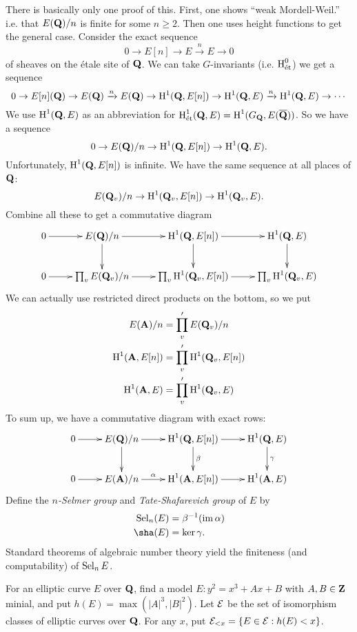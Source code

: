 There is basically only one proof of this. First, one shows ``weak 
Mordell-Weil.'' i.e. that $E(\mathbf{Q})/n$ is finite for some $n\geq 2$. Then one 
uses height functions to get the general case. Consider the exact sequence 
\[
  0 \to E[n] \to E\xrightarrow n E \to 0
\]
of sheaves on the \'etale site of $\mathbf{Q}$. We can take $G$-invariants (i.e. 
$\operatorname{H}_{\textnormal{\'et}}^0$) we get a sequence 
\[
  0 \to E[n](\mathbf{Q}) \to E(\mathbf{Q}) \xrightarrow n E(\mathbf{Q}) \to \operatorname{H}^1(\mathbf{Q}, E[n]) \to \operatorname{H}^1(\mathbf{Q},E) \xrightarrow n \operatorname{H}^1(\mathbf{Q},E) \to \cdots
\]
We use $\operatorname{H}^1(\mathbf{Q},E)$ as an abbreviation for 
$\operatorname{H}_{\textnormal{\'et}}^1(\mathbf{Q},E) = \operatorname{H}^1(G_{\mathbf{Q}},E(\overline{\mathbf{Q}}))$. So we have a sequence 
\[
  0 \to E(\mathbf{Q})/n \to \operatorname{H}^1(\mathbf{Q},E[n]) \to \operatorname{H}^1(\mathbf{Q},E) .
\]
Unfortunately, $\operatorname{H}^1(\mathbf{Q},E[n])$ is infinite. We have the same sequence at all 
places of $\mathbf{Q}$:
\[
  E(\mathbf{Q}_v)/n \to \operatorname{H}^1(\mathbf{Q}_v,E[n]) \to \operatorname{H}^1(\mathbf{Q}_v,E) .
\]
Combine all these to get a commutative diagram 
\[\xymatrix{
  0 \ar[r] 
    & E(\dQ)/n \ar[r] \ar[d] 
    & \h^1(\dQ,E[n]) \ar[r] \ar[d] 
    & \h^1(\dQ,E) \ar[d] \\
  0 \ar[r] 
    & \prod_v E(\dQ_v)/n \ar[r] 
    & \prod_v\h^1(\dQ_v,E[n]) \ar[r] 
    & \prod_v \h^1(\dQ_v,E)
}\]
We can actually use restricted direct products on the bottom, so we put 
\begin{align*}
  E(\mathbf{A})/n &= \prod_v' E(\mathbf{Q}_v)/n \\
  \operatorname{H}^1(\mathbf{A},E[n]) &= \prod_v' \operatorname{H}^1(\mathbf{Q}_v,E[n]) \\
  \operatorname{H}^1(\mathbf{A},E) &= \prod_v' \operatorname{H}^1(\mathbf{Q}_v,E)
\end{align*}
To sum up, we have a commutative diagram with exact rows:
\[\xymatrix{
  0 \ar[r] 
    & E(\dQ)/n \ar[r] \ar[d] 
    & \h^1(\dQ,E[n]) \ar[r] \ar[d]^-\beta  
    & \h^1(\dQ,E) \ar[d]^-\gamma  \\
  0 \ar[r] 
    & E(\dA)/n \ar[r]^-\alpha 
    & \h^1(\dA,E[n]) \ar[r] 
    & \h^1(\dA,E) 
}\]
Define the \emph{$n$-Selmer group} and \emph{Tate-Shafarevich group} of $E$ by 
\begin{align*}
  \selmer_n(E) &= \beta^{-1}(\im\alpha) \\
  \sha(E) &= \ker\gamma .
\end{align*}
Standard theorems of algebraic number theory yield the finiteness (and 
computability) of $\operatorname{Sel}_n E$. 

For an elliptic curve $E$ over $\mathbf{Q}$, find a model $E:y^2=x^3+A x+B$ with 
$A,B\in \mathbf{Z}$ minial, and put $h(E)=\max(|A|^3,|B|^2)$. Let $\mathcal{E}$ be the set of 
isomorphism classes of elliptic curves over $\mathbf{Q}$. For any $x$, put 
$\mathcal{E}_{<x} = \{E\in \mathcal{E}:h(E)<x\}$. 


